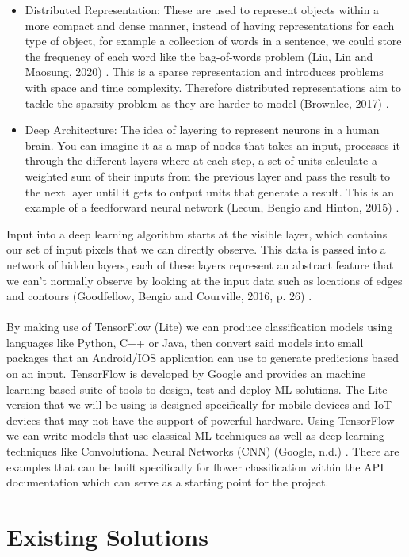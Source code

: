 \documentclass{article}
\begin{document}
\begin{itemize}
    \item Distributed Representation: These are used to represent objects within a more compact and dense manner, instead of having representations for each type of object, for example a collection of words in a sentence, we could store the frequency of each word like the bag-of-words problem (Liu, Lin and Maosung, 2020) \cite{Liu}. This is a sparse representation and introduces problems with space and time complexity. Therefore distributed representations aim to tackle the sparsity problem as they are harder to model (Brownlee, 2017) \cite{Brownlee}.
    \item Deep Architecture: The idea of layering to represent neurons in a human brain. You can imagine it as a map of nodes that takes an input, processes it through the different layers where at each step, a set of units calculate a weighted sum of their inputs from the previous layer and pass the result to the next layer until it gets to output units that generate a result. This is an example of a feedforward neural network (Lecun, Bengio and Hinton, 2015) \cite{LeCun}.
\end{itemize}
Input into a deep learning algorithm starts at the visible layer, which contains our set of input pixels that we can directly observe. This data is passed into a network of hidden layers, each of these layers represent an abstract feature that we can’t normally observe by looking at the input data such as locations of edges and contours (Goodfellow, Bengio and Courville, 2016, p. 26) \cite{Goodfellow}.
\\
\\
By making use of TensorFlow (Lite) we can produce classification models using languages like Python, C++ or Java, then convert said models into small packages that an Android/IOS application can use to generate predictions based on an input. TensorFlow is developed by Google and provides an machine learning based suite of tools to design, test and deploy ML solutions. The Lite version that we will be using is designed specifically for mobile devices and IoT devices that may not have the support of powerful hardware. Using TensorFlow we can write models that use classical ML techniques as well as deep learning techniques like Convolutional Neural Networks (CNN) (Google, n.d.) \cite{Google}. There are examples that can be built specifically for flower classification within the API documentation which can serve as a starting point for the project.
\section{Existing Solutions}
\end{document}
